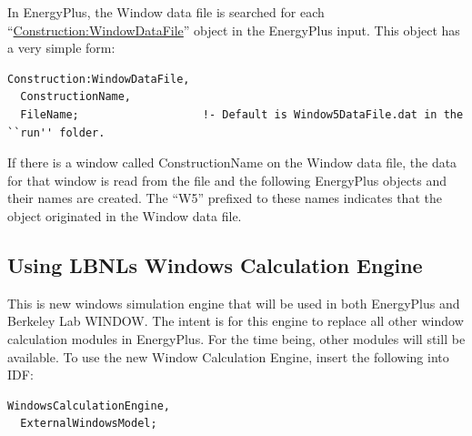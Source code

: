 In EnergyPlus, the Window data file is searched for each ``\hyperref[constructionwindowdatafile]{Construction:WindowDataFile}'' object in the EnergyPlus input. This object has a very simple form:

\begin{lstlisting}
Construction:WindowDataFile,
  ConstructionName,
  FileName;                   !- Default is Window5DataFile.dat in the ``run'' folder.
\end{lstlisting}

If there is a window called ConstructionName on the Window data file, the data for that window is read from the file and the following EnergyPlus objects and their names are created. The ``W5'' prefixed to these names indicates that the object originated in the Window data file.

\subsection{Using LBNLs Windows Calculation Engine}\label{windowscalculationengine}
This is new windows simulation engine that will be used in both EnergyPlus and Berkeley Lab WINDOW. The intent is for this engine to replace all other window calculation modules in EnergyPlus. For the time being, other modules will still be available. To use the new Window Calculation Engine, insert the following into IDF:

\begin{lstlisting}
WindowsCalculationEngine,
  ExternalWindowsModel;
\end{lstlisting}
